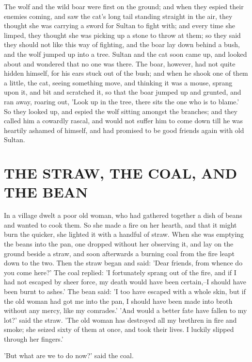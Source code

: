 \documentclass[12pt]{book}
\begin{document}
The wolf and the wild boar were first on the ground; and when they
espied their enemies coming, and saw the cat's long tail standing
straight in the air, they thought she was carrying a sword for Sultan
to fight with; and every time she limped, they thought she was picking
up a stone to throw at them; so they said they should not like this
way of fighting, and the boar lay down behind a bush, and the wolf
jumped up into a tree. Sultan and the cat soon came up, and looked
about and wondered that no one was there. The boar, however, had not
quite hidden himself, for his ears stuck out of the bush; and when he
shook one of them a little, the cat, seeing something move, and
thinking it was a mouse, sprang upon it, and bit and scratched it, so
that the boar jumped up and grunted, and ran away, roaring out, 'Look
up in the tree, there sits the one who is to blame.' So they looked
up, and espied the wolf sitting amongst the branches; and they called
him a cowardly rascal, and would not suffer him to come down till he
was heartily ashamed of himself, and had promised to be good friends
again with old Sultan.



\chapter{THE STRAW, THE COAL, AND THE BEAN}

In a village dwelt a poor old woman, who had gathered together a dish
of beans and wanted to cook them. So she made a fire on her hearth,
and that it might burn the quicker, she lighted it with a handful of
straw. When she was emptying the beans into the pan, one dropped
without her observing it, and lay on the ground beside a straw, and
soon afterwards a burning coal from the fire leapt down to the two.
Then the straw began and said: 'Dear friends, from whence do you come
here?' The coal replied: 'I fortunately sprang out of the fire, and if
I had not escaped by sheer force, my death would have been certain,--I
should have been burnt to ashes.' The bean said: 'I too have escaped
with a whole skin, but if the old woman had got me into the pan, I
should have been made into broth without any mercy, like my comrades.'
'And would a better fate have fallen to my lot?' said the straw. 'The
old woman has destroyed all my brethren in fire and smoke; she seized
sixty of them at once, and took their lives. I luckily slipped through
her fingers.'

'But what are we to do now?' said the coal.
\end{document}
